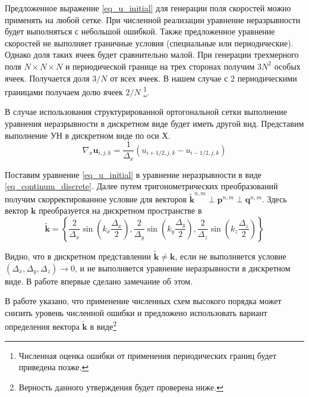 \documentclass[12pt,a4paper]{article}
\begin{document}
Предложенное выражение \ref{eq_u_initial} для генерации поля скоростей можно применять на любой сетке. При численной реализации уравнение неразрывности будет выполняться с небольшой ошибкой. Также предложенное уравнение скоростей не выполняет граничные условия (специальные или периодические). Однако доля таких ячеек будет сравнительно малой. При генерации трехмерного поля $N\times N\times N$ и периодической границе на трех сторонах получим $3 N^2$ особых ячеек. Получается доля $3 / N$ от всех ячеек. В нашем случае с 2 периодическими границами получаем долю ячеек $2 / N$ \footnote{Численная оценка ошибки от применения периодических границ будет приведена позже.}.




В случае использования структурированной ортогональной сетки выполнение уравнения неразрывности в дискретном виде будет иметь другой вид. Представим выполнение УН в дискретном  виде по оси Х.
\begin{equation} \label{eq_continum_discrete}
	\nabla_x \boldsymbol{u}_{i,j,k} = \frac{1}{\Delta_x}\left( u_{i+1/2,j,k}-u_{i-1/2,j,k}\right)
\end{equation}

Поставим уравнение \ref{eq_u_initial}  в уравнение неразрывности в виде \ref{eq_continum_discrete}. Далее путем тригонометрических преобразований получим скорректированное условие для векторов  $\boldsymbol{\tilde{k}}^{n,m}\perp \boldsymbol{p}^{n,m}\perp \boldsymbol{q}^{n,m}$. Здесь вектор  $\boldsymbol{{k}}$ преобразуется на дискретном пространстве в 
\begin{equation} \label{eq_tilde_k}
\boldsymbol{\tilde{k}} = \left\{ 
\frac{2}{\Delta_x} \sin{\left( k_x \frac{\Delta_x}{2}  \right)},
\frac{2}{\Delta_y} \sin{\left( k_y \frac{\Delta_y}{2}  \right)},
\frac{2}{\Delta_z} \sin{\left( k_z \frac{\Delta_z}{2}  \right)} \right\}
\end{equation}

Видно, что в дискретном представлении  $\tilde{\boldsymbol{k}}\neq \boldsymbol{k}$, если не выполняется условие $\left(\Delta_x , \Delta_y, \Delta_z\right) \rightarrow 0$, и не выполняется уравнение неразрывности в дискретном виде. В работе \cite{bailly_stochastic_1999} впервые сделано замечание об этом.  

В работе \cite{saad_comment_2016} указано, что применение численных схем высокого порядка может снизить уровень численной ошибки и предложено использовать вариант определения вектора $\tilde{\boldsymbol{k}}$ в виде\footnote{Верность данного утверждения будет проверена ниже.}
\end{document}
